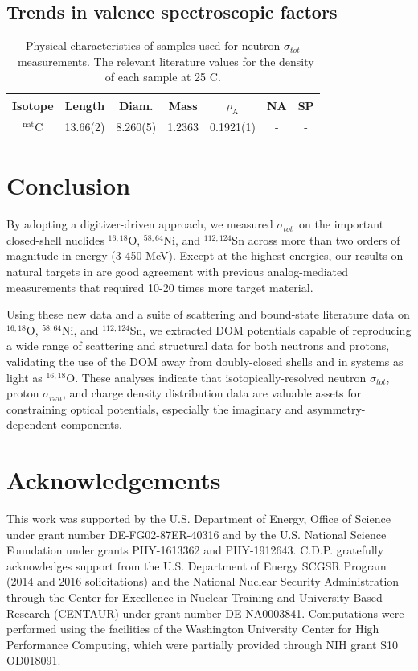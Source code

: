 \documentclass[twocolumn,secnumarabic,amssymb, nobibnotes, aps, prl,
superscriptaddress, nobalancelastpage, draft]{revtex4}
\newcommand{\tot}{\ensuremath{\sigma_{tot}}}
\newcommand{\rxn}{\ensuremath{\sigma_{rxn}}}
\newcommand{\oSixEight}{\ensuremath{^{16,18}}O}
\newcommand{\niEightFour}{\ensuremath{^{58,64}}N\lowercase{i}}
\newcommand{\snTwelveFour}{\ensuremath{^{112,124}}S\lowercase{n}}
\begin{document}
\subsection{Trends in valence spectroscopic factors}
\begin{table}[tb]
    \centering
    \begin{tabular}{c c c c c c c}
        \small Isotope & Length & Diam. & Mass & $\rho_{\text{A}}$ & NA & SP\\
        \hline
        $^{\text{nat}}$C& 13.66(2)& 8.260(5)& 1.2363& 0.1921(1)& -& -\\
    \end{tabular}
    \centering
    \caption{Physical characteristics of samples used for neutron \tot\ measurements.
The relevant literature values for the density of each sample at 25 C.}
    \label{SpectroscopicFactors}
\end{table}

\section{Conclusion}
By adopting a digitizer-driven
approach, we measured \tot\ on the important closed-shell nuclides
$^{16,18}$O, $^{58,64}$Ni, and $^{112,124}$Sn across more than two orders of
magnitude in energy (3-450 MeV). Except at the highest energies, our results
on natural targets in are good agreement with previous analog-mediated measurements
that required 10-20 times more target material. 

Using these new data and a suite of scattering and bound-state literature data
on \oSixEight, \niEightFour, and \snTwelveFour,
we extracted DOM potentials capable of reproducing a wide range of scattering
and structural data for both neutrons and protons, validating the use of the
DOM away from doubly-closed shells and in systems as light as \oSixEight.
These analyses indicate that isotopically-resolved neutron \tot,
proton \rxn, and charge density distribution data are valuable assets for
constraining optical potentials, especially the imaginary and
asymmetry-dependent components.

\section{Acknowledgements}
This work was supported by the U.S. Department of Energy, Office of Science under grant number
DE-FG02-87ER-40316 and by the U.S. National Science Foundation under grants
PHY-1613362 and PHY-1912643. C.D.P. gratefully acknowledges support from the
U.S. Department of Energy SCGSR Program (2014 and 2016 solicitations) and the
National Nuclear Security Administration through the Center for Excellence in Nuclear
Training and University Based Research (CENTAUR) under grant number DE-NA0003841.
Computations were performed using the facilities of the Washington University
Center for High Performance Computing, which were partially provided through NIH
grant S10 OD018091. 
\end{document}
